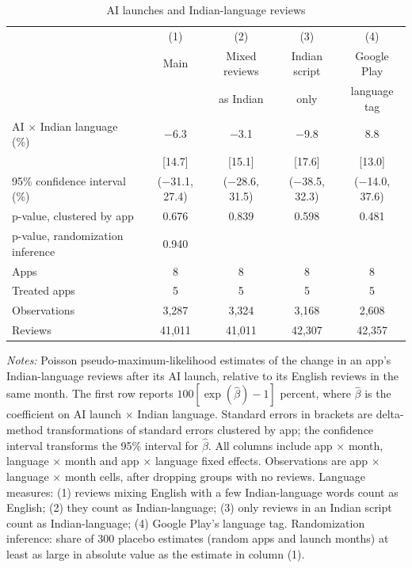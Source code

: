 \begin{table}[htbp]
\centering
\begin{threeparttable}
\caption{AI launches and Indian-language reviews}
\label{tab:main}
\begin{tabular}{@{}lcccc@{}}
\toprule
 & (1) & (2) & (3) & (4) \\
 & Main & Mixed reviews & Indian script & Google Play \\
 &  & as Indian & only & language tag \\
\midrule
AI $\times$ Indian language (\%) & $-$6.3 & $-$3.1 & $-$9.8 & 8.8 \\
 & [14.7] & [15.1] & [17.6] & [13.0] \\
95\% confidence interval (\%) & ($-$31.1, 27.4) & ($-$28.6, 31.5) & ($-$38.5, 32.3) & ($-$14.0, 37.6) \\
p-value, clustered by app & 0.676 & 0.839 & 0.598 & 0.481 \\
p-value, randomization inference & 0.940 &  &  &  \\
\midrule
Apps & 8 & 8 & 8 & 8 \\
Treated apps & 5 & 5 & 5 & 5 \\
Observations & 3,287 & 3,324 & 3,168 & 2,608 \\
Reviews & 41,011 & 41,011 & 42,307 & 42,357 \\
\bottomrule
\end{tabular}
\begin{tablenotes}[flushleft]
\footnotesize
\item \textit{Notes:} Poisson pseudo-maximum-likelihood estimates of the change in an app's Indian-language reviews after its AI launch, relative to its English reviews in the same month. The first row reports $100[\exp(\hat\beta)-1]$ percent, where $\hat\beta$ is the coefficient on AI launch $\times$ Indian language. Standard errors in brackets are delta-method transformations of standard errors clustered by app; the confidence interval transforms the 95\% interval for $\hat\beta$. All columns include app $\times$ month, language $\times$ month and app $\times$ language fixed effects. Observations are app $\times$ language $\times$ month cells, after dropping groups with no reviews. Language measures: (1) reviews mixing English with a few Indian-language words count as English; (2) they count as Indian-language; (3) only reviews in an Indian script count as Indian-language; (4) Google Play's language tag. Randomization inference: share of 300 placebo estimates (random apps and launch months) at least as large in absolute value as the estimate in column (1).
\end{tablenotes}
\end{threeparttable}
\end{table}
